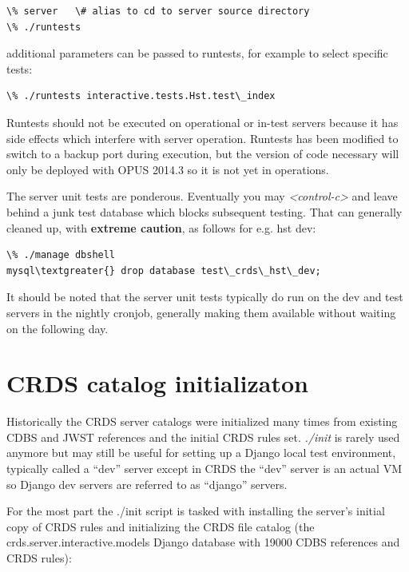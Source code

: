 \documentclass[letterpaper,10pt,english]{sphinxmanual}
\begin{document}
\begin{Verbatim}[commandchars=\\\{\}]
\% server   \# alias to cd to server source directory
\% ./runtests
\end{Verbatim}

additional parameters can be passed to runtests,  for example to select specific tests:

\begin{Verbatim}[commandchars=\\\{\}]
\% ./runtests interactive.tests.Hst.test\_index
\end{Verbatim}

Runtests should not be executed on operational or in-test servers because it has side effects which interfere with
server operation.   Runtests has been modified to switch to a backup port during execution,  but the version of
code necessary will only be deployed with OPUS 2014.3 so it is not yet in operations.

The server unit tests are ponderous.  Eventually you may \emph{\textless{}control-c\textgreater{}} and leave behind a junk test
database which blocks subsequent testing.  That can generally cleaned up,  with \textbf{extreme caution},  as follows
for e.g. hst dev:

\begin{Verbatim}[commandchars=\\\{\}]
\% ./manage dbshell
mysql\textgreater{} drop database test\_crds\_hst\_dev;
\end{Verbatim}

It should be noted that the server unit tests typically do run on the dev and test servers in the nightly
cronjob, generally making them available without waiting on the following day.


\section{CRDS catalog initializaton}
\label{server_guide:crds-catalog-initializaton}
Historically the CRDS server catalogs were initialized many times from existing CDBS and JWST references and
the initial CRDS rules set.  \emph{./init} is rarely used anymore but may still be useful for setting up a Django local
test environment, typically called a ``dev'' server except in CRDS the ``dev'' server is an actual VM so Django dev
servers are referred to as ``django'' servers.

For the most part the ./init script is tasked with installing the server's initial copy of CRDS rules and initializing
the CRDS file catalog (the crds.server.interactive.models Django database with 19000 CDBS references and CRDS rules):
\end{document}
